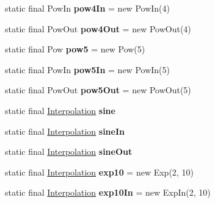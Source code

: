 \begin{DoxyCompactItemize}
\item 
\hypertarget{classairhockeyjava_1_1util_1_1_interpolation_aef96226ed5f7e37c7bea26fff454fdc0}{}static final Pow\+In {\bfseries pow4\+In} = new Pow\+In(4)\label{classairhockeyjava_1_1util_1_1_interpolation_aef96226ed5f7e37c7bea26fff454fdc0}

\item 
\hypertarget{classairhockeyjava_1_1util_1_1_interpolation_a43ebdf766e0f6b5f183c7442aa201730}{}static final Pow\+Out {\bfseries pow4\+Out} = new Pow\+Out(4)\label{classairhockeyjava_1_1util_1_1_interpolation_a43ebdf766e0f6b5f183c7442aa201730}

\item 
\hypertarget{classairhockeyjava_1_1util_1_1_interpolation_af1d563fa83c7b8c3149fa60bc42b1ec6}{}static final Pow {\bfseries pow5} = new Pow(5)\label{classairhockeyjava_1_1util_1_1_interpolation_af1d563fa83c7b8c3149fa60bc42b1ec6}

\item 
\hypertarget{classairhockeyjava_1_1util_1_1_interpolation_ad74e83110b8abdda654bbbd016538a31}{}static final Pow\+In {\bfseries pow5\+In} = new Pow\+In(5)\label{classairhockeyjava_1_1util_1_1_interpolation_ad74e83110b8abdda654bbbd016538a31}

\item 
\hypertarget{classairhockeyjava_1_1util_1_1_interpolation_ab32df96bfd83fe409c2495b6f2786773}{}static final Pow\+Out {\bfseries pow5\+Out} = new Pow\+Out(5)\label{classairhockeyjava_1_1util_1_1_interpolation_ab32df96bfd83fe409c2495b6f2786773}

\item 
static final \hyperlink{classairhockeyjava_1_1util_1_1_interpolation}{Interpolation} {\bfseries sine}
\item 
static final \hyperlink{classairhockeyjava_1_1util_1_1_interpolation}{Interpolation} {\bfseries sine\+In}
\item 
static final \hyperlink{classairhockeyjava_1_1util_1_1_interpolation}{Interpolation} {\bfseries sine\+Out}
\item 
\hypertarget{classairhockeyjava_1_1util_1_1_interpolation_a229514ac6f5ec484d86c170e49f9aa11}{}static final \hyperlink{classairhockeyjava_1_1util_1_1_interpolation}{Interpolation} {\bfseries exp10} = new Exp(2, 10)\label{classairhockeyjava_1_1util_1_1_interpolation_a229514ac6f5ec484d86c170e49f9aa11}

\item 
\hypertarget{classairhockeyjava_1_1util_1_1_interpolation_a50a1fd82243d75654dccb639b8a36c70}{}static final \hyperlink{classairhockeyjava_1_1util_1_1_interpolation}{Interpolation} {\bfseries exp10\+In} = new Exp\+In(2, 10)\label{classairhockeyjava_1_1util_1_1_interpolation_a50a1fd82243d75654dccb639b8a36c70}


\end{DoxyCompactItemize}
